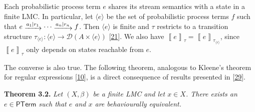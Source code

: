 \documentclass[11pt,a4paper]{amsart}
\begin{document}
\par\medskip
\hypertarget{html:S3.SS0.SSS0.Px1.p3}{} Each probabilistic process term %
\hypertarget{html:S3.SS0.SSS0.Px1.p3.m1}{}\({e}\) shares its stream semantics with a state in a finite LMC. In particular, let %
\hypertarget{html:S3.SS0.SSS0.Px1.p3.m2}{}\({\langle e\rangle}\) be the set of probabilistic process terms %
\hypertarget{html:S3.SS0.SSS0.Px1.p3.m3}{}\({f}\) such that %
\hypertarget{html:S3.SS0.SSS0.Px1.p3.m4}{}\({e\mathrel{\raisebox{-2.0pt}{$\xrightarrow{a_{1}\mid r_{1}}$}}\cdots\mathrel{\raisebox{-2.0pt}{$\xrightarrow{a_{n}\mid r_{n}}$}}f}\). Then %
\hypertarget{html:S3.SS0.SSS0.Px1.p3.m5}{}\({\langle e\rangle}\) is finite and %
\hypertarget{html:S3.SS0.SSS0.Px1.p3.m6}{}\({\tau}\) restricts to a transition structure %
\hypertarget{html:S3.SS0.SSS0.Px1.p3.m7}{}\({\tau_{\langle e\rangle}\colon\langle e\rangle\to{\mathcal{D}}(A\times\langle e\rangle)}\) [\hyperlink{html:bib.bib21}{21}]. We also have %
\hypertarget{html:S3.SS0.SSS0.Px1.p3.m8}{}\({\left\llbracket{e}\right\rrbracket_{\tau}=\left\llbracket{e}\right\rrbracket_{\tau_{\langle e\rangle}}}\), since %
\hypertarget{html:S3.SS0.SSS0.Px1.p3.m9}{}\({\left\llbracket{e}\right\rrbracket_{\tau}}\) only depends on states reachable from %
\hypertarget{html:S3.SS0.SSS0.Px1.p3.m10}{}\({e}\).
\par\medskip
\hypertarget{html:S3.SS0.SSS0.Px1.p4}{} The converse is also true. The following theorem, analogous to Kleene’s theorem for regular expressions [\hyperlink{html:bib.bib10}{10}], is a direct consequence of results presented in [\hyperlink{html:bib.bib29}{29}].
\par\medskip
\hypertarget{html:S3.Thmtheorem2}{} \par\noindent\textbf{\textbf{Theorem 3.2}\textbf{.}}\quad  %
\hypertarget{html:S3.Thmtheorem2.p1}{} \emph{Let %
\hypertarget{html:S3.Thmtheorem2.p1.m1}{}\({(X,\beta)}\) be a finite LMC and let %
\hypertarget{html:S3.Thmtheorem2.p1.m2}{}\({x\in X}\). There exists an %
\hypertarget{html:S3.Thmtheorem2.p1.m3}{}\({e\in\mathsf{PTerm}}\) such that %
\hypertarget{html:S3.Thmtheorem2.p1.m4}{}\({e}\) and %
\hypertarget{html:S3.Thmtheorem2.p1.m5}{}\({x}\) are behaviourally equivalent.}
\end{document}
